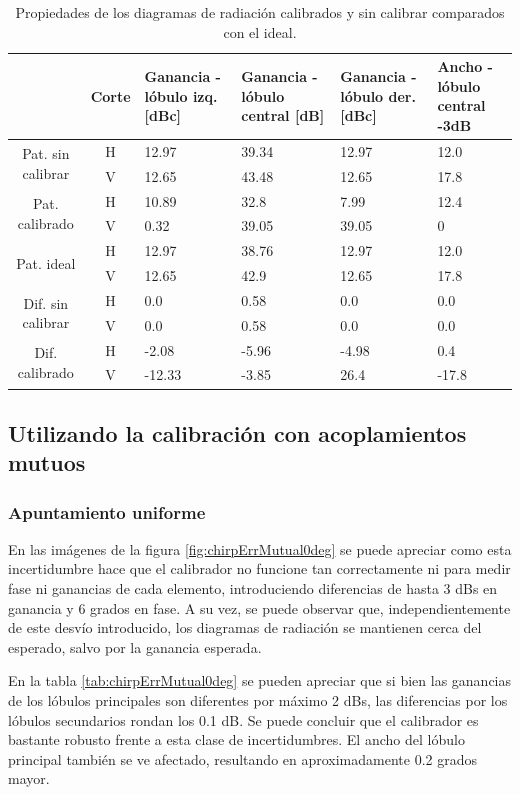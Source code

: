 \begin{table}[H]
  \footnotesize
  \centering
  \begin{tabular}{|c|c|p{2cm}|p{2.5cm}|p{2.5cm}|p{2.5cm}|}
    \cline{2-6}
    \multicolumn{1}{c|}{} & Corte & Ganancia - lóbulo izq. [dBc] & Ganancia - lóbulo central [dB] &
    Ganancia - lóbulo der. [dBc] & Ancho - lóbulo central -3dB \tabularnewline\hline
    \multirow{2}{2cm}{Pat. sin calibrar} & H & 12.97 & 39.34 & 12.97 & 12.0 \tabularnewline\cline{2-6}
     & V & 12.65 & 43.48 & 12.65 & 17.8 \tabularnewline\hline
    \multirow{2}{2cm}{Pat. calibrado} & H & 10.89 & 32.8 & 7.99 & 12.4 \tabularnewline\cline{2-6}
     & V & 0.32 & 39.05 & 39.05 & 0 \tabularnewline\hline
    \multirow{2}{2cm}{Pat. ideal} & H & 12.97 & 38.76 & 12.97 & 12.0 \tabularnewline\cline{2-6}
     & V & 12.65 & 42.9 & 12.65 & 17.8 \tabularnewline\hline
    \multirow{2}{2cm}{Dif. sin calibrar} & H & 0.0 & 0.58 & 0.0 & 0.0\tabularnewline\cline{2-6}
     & V & 0.0 & 0.58 & 0.0 & 0.0 \tabularnewline\hline
    \multirow{2}{2cm}{Dif. calibrado} & H & -2.08 & -5.96 & -4.98 & 0.4 \tabularnewline\cline{2-6}
     & V & -12.33 & -3.85 & 26.4 & -17.8 \tabularnewline\hline
  \end{tabular}
  \caption{Propiedades de los diagramas de radiación calibrados y sin calibrar comparados con el ideal.}
  \label{tab:chirpErrClassical10degRow}
\end{table}


\subsection{Utilizando la calibración con acoplamientos mutuos}

\subsubsection{Apuntamiento uniforme}

En las imágenes de la figura \ref{fig:chirpErrMutual0deg} se puede apreciar como esta incertidumbre hace que el calibrador 
no funcione tan correctamente ni para medir fase ni ganancias de cada elemento, introduciendo diferencias de hasta 3 dBs en 
ganancia y 6 grados en fase. A su vez, se puede observar que, independientemente de este desvío introducido, los diagramas de 
radiación se mantienen cerca del esperado, salvo por la ganancia esperada.

En la tabla \ref{tab:chirpErrMutual0deg} se pueden apreciar que si bien las ganancias de los lóbulos principales son 
diferentes por máximo 2 dBs, las diferencias por los lóbulos secundarios rondan los 0.1 dB. Se puede concluir que el 
calibrador es bastante robusto frente a esta clase de incertidumbres. El ancho del lóbulo principal también se ve afectado,
resultando en aproximadamente 0.2 grados mayor.

